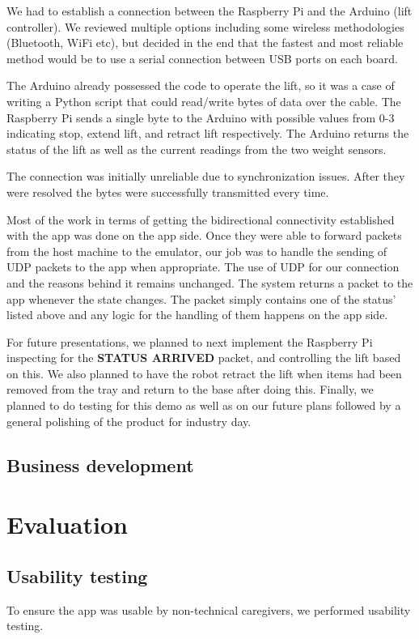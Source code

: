 \documentclass{article}
\begin{document}
We had to establish a connection between the Raspberry Pi and the Arduino (lift controller). We reviewed multiple options including some wireless methodologies (Bluetooth, WiFi etc), but decided in the end that the fastest and most reliable method would be to use a serial connection between USB ports on each board.

The Arduino already possessed the code to operate the lift, so it was a case of writing a Python script that could read/write bytes of data over the cable. The Raspberry Pi sends a single byte to the Arduino with possible values from 0-3 indicating stop, extend lift, and retract lift respectively. The Arduino returns the status of the lift as well as the current readings from the two weight sensors.

The connection was initially unreliable due to synchronization issues. After they were resolved the bytes were successfully transmitted every time.

Most of the work in terms of getting the bidirectional connectivity established with the app was done on the app side. Once they were able to forward packets from the host machine to the emulator, our job was to handle the sending of UDP packets to the app when appropriate. The use of UDP for our connection and the reasons behind it remains unchanged. The system returns a packet to the app whenever the state changes. The packet simply contains one of the status' listed above and any logic for the handling of them happens on the app side.

For future presentations, we planned to next implement the Raspberry Pi inspecting for the {\bf STATUS ARRIVED} packet, and controlling the lift based on this. We also planned to have the robot retract the lift when items had been removed from the tray and return to the base after doing this. Finally, we planned to do testing for this demo as well as on our future plans followed by a general polishing of the product for industry day.

\subsection{Business development}

\section{Evaluation}
\subsection{Usability testing}
To ensure the app was usable by non-technical caregivers, we performed usability testing.
\end{document}

